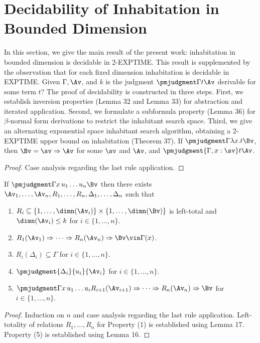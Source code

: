 \section*{Decidability of Inhabitation in Bounded Dimension}
In this section, we give the main result of the present work: inhabitation in bounded dimension is decidable in 2-EXPTIME. This result is supplemented by the observation that for each fixed dimension inhabitation is decidable in EXPTIME.
 Given $\Gamma,\Av$, and $k$ is the judgment $\pmjudgment\Gamma t\Av$ derivable for some term $t$?
The proof of decidability is constructed in three steps. First, we establish inversion properties (Lemma 32 and Lemma 33) for abstraction and iterated application. Second, we formulate a subformula property (Lemma 36) for $\beta$-normal form derivations to restrict the inhabitant search space. Third, we give an alternating exponential space inhabitant search algorithm, obtaining a 2-EXPTIME upper bound on inhabitation (Theorem 37).
 If $\pmjudgment\Gamma{\lambda x.t}\Bv$, then $\Bv=\sv\Rightarrow\Av$ for some $\sv$ and $\Av$, and $\pmjudgment{\Gamma,x:\sv}t\Av$.
\begin{proof}Case analysis regarding the last rule application.\end{proof}
 If $\pmjudgment\Gamma{x\,u_1\ldots u_n}\Bv$ then there exists $\Av_1,\ldots,\Av_n,R_1,\ldots,R_n,\Delta_1,\ldots,\Delta_n$ such that
\begin{enumerate}
\item $R_i\subseteq\{1,\ldots,\dimn(\Av_i)\}\times\{1,\ldots,\dimn(\Bv)\}$ is left-total and $\dimn(\Av_i)\leq k$ for $i\in\{1,\ldots,n\}$.
\item $R_1(\Av_1)\Rightarrow\cdots\Rightarrow R_n(\Av_n)\Rightarrow\Bv\vin\Gamma(x)$.
\item $R_i(\Delta_i)\subseteq\Gamma$ for $i\in\{1,\ldots,n\}$.
\item $\pmjudgment{\Delta_i}{u_i}{\Av_i}$ for $i\in\{1,\ldots,n\}$.
\item $\pmjudgment\Gamma{x\,u_1\ldots u_i}{R_{i+1}(\Av_{i+1})\Rightarrow\cdots\Rightarrow R_n(\Av_n)\Rightarrow\Bv}$ for $i\in\{1,\ldots,n\}$.
\end{enumerate}
\begin{proof}
Induction on $n$ and case analysis regarding the last rule application. Left-totality of relations $R_1,\ldots,R_n$ for Property (1) is established using Lemma 17. Property (5) is established using Lemma 16.
\end{proof}
